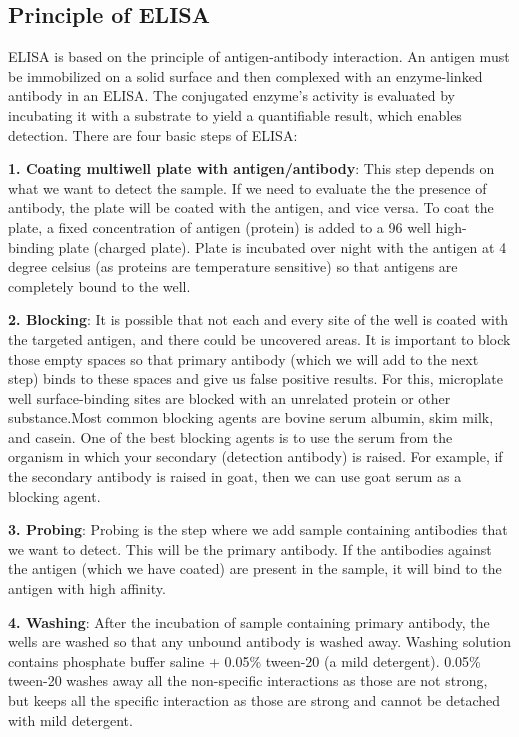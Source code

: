 \documentclass[
]{book}
\begin{document}
\subsection{\texorpdfstring{\textbf{Principle of ELISA}}{Principle of ELISA}}\label{principle-of-elisa}

ELISA is based on the principle of antigen-antibody interaction. An antigen must be immobilized on a solid surface and then complexed with an enzyme-linked antibody in an ELISA. The conjugated enzyme's activity is evaluated by incubating it with a substrate to yield a quantifiable result, which enables detection. There are four basic steps of ELISA:

\textbf{1. Coating multiwell plate with antigen/antibody}: This step depends on what we want to detect the sample. If we need to evaluate the the presence of antibody, the plate will be coated with the antigen, and vice versa. To coat the plate, a fixed concentration of antigen (protein) is added to a 96 well high-binding plate (charged plate). Plate is incubated over night with the antigen at 4 degree celsius (as proteins are temperature sensitive) so that antigens are completely bound to the well.

\textbf{2. Blocking}: It is possible that not each and every site of the well is coated with the targeted antigen, and there could be uncovered areas. It is important to block those empty spaces so that primary antibody (which we will add to the next step) binds to these spaces and give us false positive results. For this, microplate well surface-binding sites are blocked with an unrelated protein or other substance.Most common blocking agents are bovine serum albumin, skim milk, and casein. One of the best blocking agents is to use the serum from the organism in which your secondary (detection antibody) is raised. For example, if the secondary antibody is raised in goat, then we can use goat serum as a blocking agent.

\textbf{3. Probing}: Probing is the step where we add sample containing antibodies that we want to detect. This will be the primary antibody. If the antibodies against the antigen (which we have coated) are present in the sample, it will bind to the antigen with high affinity.

\textbf{4. Washing}: After the incubation of sample containing primary antibody, the wells are washed so that any unbound antibody is washed away. Washing solution contains phosphate buffer saline + 0.05\% tween-20 (a mild detergent). 0.05\% tween-20 washes away all the non-specific interactions as those are not strong, but keeps all the specific interaction as those are strong and cannot be detached with mild detergent.
\end{document}
